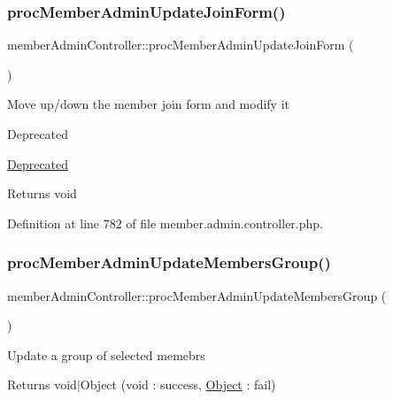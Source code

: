 \hypertarget{classmemberAdminController_a7ace7e29b0cb0b6108ace990e9c9ec27}{}\label{classmemberAdminController_a7ace7e29b0cb0b6108ace990e9c9ec27} 
\subsubsection{\texorpdfstring{proc\+Member\+Admin\+Update\+Join\+Form()}{procMemberAdminUpdateJoinForm()}}
{\footnotesize\ttfamily member\+Admin\+Controller\+::proc\+Member\+Admin\+Update\+Join\+Form (\begin{DoxyParamCaption}{ }\end{DoxyParamCaption})}

Move up/down the member join form and modify it \begin{DoxyRefDesc}{Deprecated}
\item[\hyperlink{deprecated__deprecated000022}{Deprecated}]\end{DoxyRefDesc}
\begin{DoxyReturn}{Returns}
void 
\end{DoxyReturn}


Definition at line 782 of file member.\+admin.\+controller.\+php.

\hypertarget{classmemberAdminController_a5d65dac896cd8e9772a9f41d34a540b1}{}\label{classmemberAdminController_a5d65dac896cd8e9772a9f41d34a540b1} 
\subsubsection{\texorpdfstring{proc\+Member\+Admin\+Update\+Members\+Group()}{procMemberAdminUpdateMembersGroup()}}
{\footnotesize\ttfamily member\+Admin\+Controller\+::proc\+Member\+Admin\+Update\+Members\+Group (\begin{DoxyParamCaption}{ }\end{DoxyParamCaption})}

Update a group of selected memebrs \begin{DoxyReturn}{Returns}
void$\vert$\+Object (void \+: success, \hyperlink{classObject}{Object} \+: fail) 
\end{DoxyReturn}


